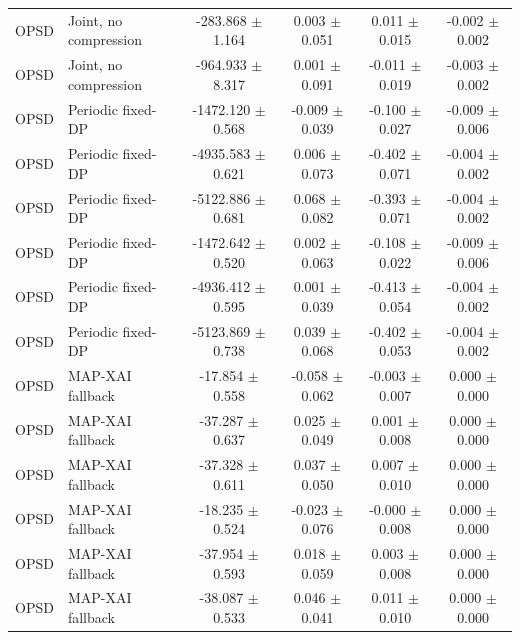 \begin{tabular}{llcccc}
OPSD & Joint, no compression & -283.868 $\pm$ 1.164 & 0.003 $\pm$ 0.051 & 0.011 $\pm$ 0.015 & -0.002 $\pm$ 0.002 \\
OPSD & Joint, no compression & -964.933 $\pm$ 8.317 & 0.001 $\pm$ 0.091 & -0.011 $\pm$ 0.019 & -0.003 $\pm$ 0.002 \\
OPSD & Periodic fixed-DP & -1472.120 $\pm$ 0.568 & -0.009 $\pm$ 0.039 & -0.100 $\pm$ 0.027 & -0.009 $\pm$ 0.006 \\
OPSD & Periodic fixed-DP & -4935.583 $\pm$ 0.621 & 0.006 $\pm$ 0.073 & -0.402 $\pm$ 0.071 & -0.004 $\pm$ 0.002 \\
OPSD & Periodic fixed-DP & -5122.886 $\pm$ 0.681 & 0.068 $\pm$ 0.082 & -0.393 $\pm$ 0.071 & -0.004 $\pm$ 0.002 \\
OPSD & Periodic fixed-DP & -1472.642 $\pm$ 0.520 & 0.002 $\pm$ 0.063 & -0.108 $\pm$ 0.022 & -0.009 $\pm$ 0.006 \\
OPSD & Periodic fixed-DP & -4936.412 $\pm$ 0.595 & 0.001 $\pm$ 0.039 & -0.413 $\pm$ 0.054 & -0.004 $\pm$ 0.002 \\
OPSD & Periodic fixed-DP & -5123.869 $\pm$ 0.738 & 0.039 $\pm$ 0.068 & -0.402 $\pm$ 0.053 & -0.004 $\pm$ 0.002 \\
OPSD & MAP-XAI fallback & -17.854 $\pm$ 0.558 & -0.058 $\pm$ 0.062 & -0.003 $\pm$ 0.007 & 0.000 $\pm$ 0.000 \\
OPSD & MAP-XAI fallback & -37.287 $\pm$ 0.637 & 0.025 $\pm$ 0.049 & 0.001 $\pm$ 0.008 & 0.000 $\pm$ 0.000 \\
OPSD & MAP-XAI fallback & -37.328 $\pm$ 0.611 & 0.037 $\pm$ 0.050 & 0.007 $\pm$ 0.010 & 0.000 $\pm$ 0.000 \\
OPSD & MAP-XAI fallback & -18.235 $\pm$ 0.524 & -0.023 $\pm$ 0.076 & -0.000 $\pm$ 0.008 & 0.000 $\pm$ 0.000 \\
OPSD & MAP-XAI fallback & -37.954 $\pm$ 0.593 & 0.018 $\pm$ 0.059 & 0.003 $\pm$ 0.008 & 0.000 $\pm$ 0.000 \\
OPSD & MAP-XAI fallback & -38.087 $\pm$ 0.533 & 0.046 $\pm$ 0.041 & 0.011 $\pm$ 0.010 & 0.000 $\pm$ 0.000 \\
\bottomrule
\end{tabular}
